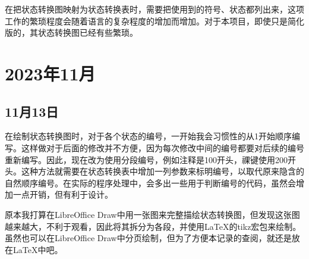 在把状态转换图映射为状态转换表时，需要把使用到的符号、状态都列出来，这项工作的繁琐程度会随着语言的复杂程度的增加而增加。对于本项目，即使只是简化版的，其状态转换图已经有些繁琐。


\section{2023年11月}


\subsection{11月13日}
在绘制状态转换图时，对于各个状态的编号，一开始我会习惯性的从1开始顺序编写。这样做对于后面的修改并不方便，因为每次修改中间的编号都要对后续的编号重新编写。因此，现在改为使用分段编号，例如注释是100开头，祼键使用200开头。这种方法就需要在状态转换表中增加一列参数来标明编号，以取代原来隐含的自然顺序编号。在实际的程序处理中，会多出一些用于判断编号的代码，虽然会增加一点开销，但有利于设计。

原本我打算在LibreOffice Draw中用一张图来完整描绘状态转换图，但发现这张图越来越大，不利于观看，因此将其拆分为各段，并使用LaTeX的tikz宏包来绘制。虽然也可以在LibreOffice Draw中分页绘制，但为了方便本记录的查阅，就还是放在LaTeX中吧。
